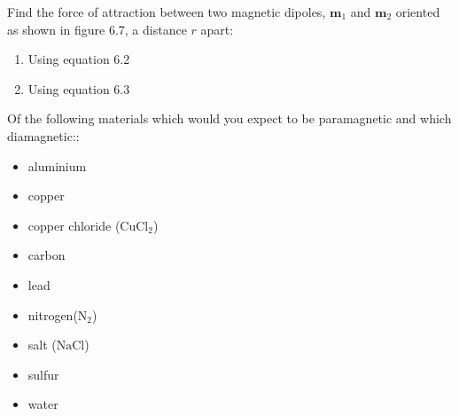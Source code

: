 \documentclass{homework}
\newcommand{\bs}[1]{\ensuremath{\boldsymbol{#1}}}
\begin{document}
\maketitle

\begin{homeworkProblem}[Problem 6.3]

  Find the force of attraction between two magnetic dipoles, $\bs{m}_1$ and $\bs{m}_2$ oriented as shown in figure 6.7, a distance $r$ apart:

  \begin{enumerate}
    \item Using equation 6.2
    \item Using equation 6.3
  \end{enumerate}

  \vspace{.2in}

  \problemAnswer{ %



  }
\end{homeworkProblem}

\begin{homeworkProblem}[Problem 6.6]

  Of the following materials which would you expect to be paramagnetic and which diamagnetic::

  \begin{itemize}
    \item aluminium
    \item copper
    \item copper chloride ($\text{CuCl}_2$)
    \item carbon
    \item lead
    \item nitrogen($\text{N}_2$)
    \item salt ($\text{NaCl}$)
    \item sulfur
    \item water
  \end{itemize}

  \vspace{.2in}

  \problemAnswer{ %



  }
\end{homeworkProblem}
\end{document}
